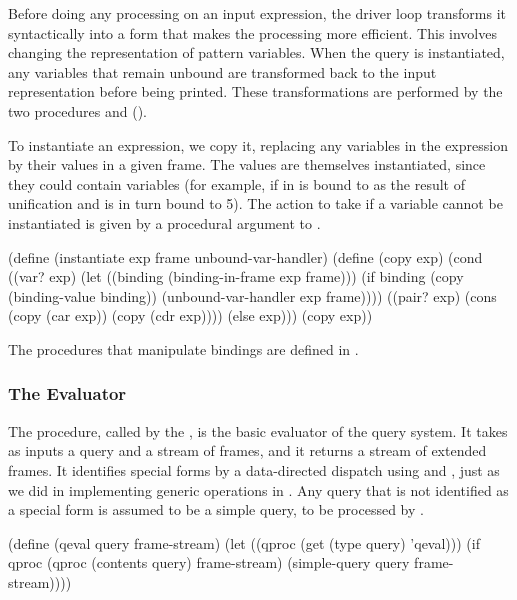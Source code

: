 Before doing any processing on an input expression, the driver loop transforms
it syntactically into a form that makes the processing more efficient.  This
involves changing the representation of pattern variables.  When the query is
instantiated, any variables that remain unbound are transformed back to the
input representation before being printed.  These transformations are performed
by the two procedures  and
 ().

To instantiate an expression, we copy it, replacing any variables in the
expression by their values in a given frame.  The values are themselves
instantiated, since they could contain variables (for example, if  in
 is bound to  as the result of unification and  is
in turn bound to 5).  The action to take if a variable cannot be instantiated
is given by a procedural argument to .

\begin{codeBlock}
(define (instantiate exp frame unbound-var-handler)
  (define (copy exp)
    (cond ((var? exp)
           (let ((binding (binding-in-frame exp frame)))
             (if binding
                 (copy (binding-value binding))
                 (unbound-var-handler exp frame))))
          ((pair? exp)
           (cons (copy (car exp)) (copy (cdr exp))))
          (else exp)))
  (copy exp))
\end{codeBlock}

\noindent
The procedures that manipulate bindings are defined in .

\subsubsection{The Evaluator}
\label{Section 4.4.4.2}

The  procedure, called by the , is the
basic evaluator of the query system.  It takes as inputs a query and a stream
of frames, and it returns a stream of extended frames.  It identifies special
forms by a data-directed dispatch using  and , just as we
did in implementing generic operations in .  Any query that is
not identified as a special form is assumed to be a simple query, to be
processed by .

\begin{codeBlock}
(define (qeval query frame-stream)
  (let ((qproc (get (type query) 'qeval)))
    (if qproc
        (qproc (contents query) frame-stream)
        (simple-query query frame-stream))))
\end{codeBlock}

